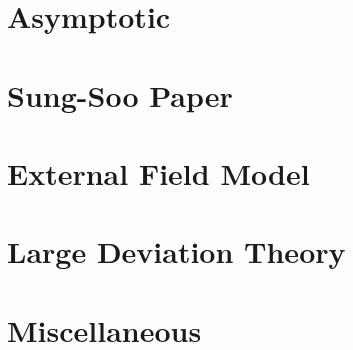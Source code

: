 \documentclass[]{report}
\numberwithin{equation}{section} %
\begin{document}
\chapter{Asymptotic}
\label{Chapter: Asymptotics}



\chapter{Sung-Soo Paper}
\label{Chapter: Paper}



\chapter{External Field Model}
\label{Chapter: External Field}



\chapter{Large Deviation Theory}
\label{Chapter: Large Deviation}

\chapter{Miscellaneous}
\label{Chapter: Appendix}



 

{}

\end{document}
